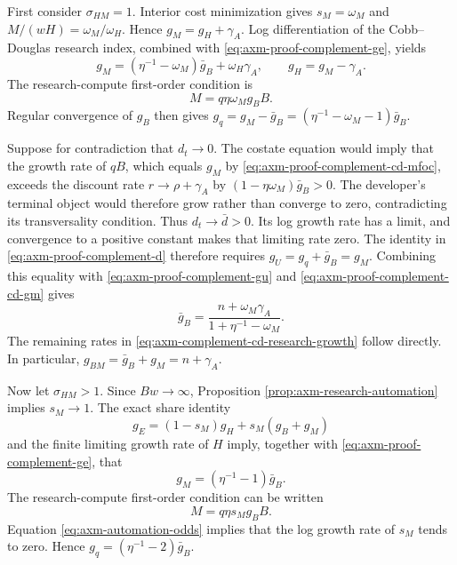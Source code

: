 First consider \(\sigma_{HM}=1\). Interior cost minimization gives
\(s_M=\omega_M\) and \(M/(wH)=\omega_M/\omega_H\). Hence
\(g_M=g_H+\gamma_A\). Log differentiation of the
Cobb--Douglas research index, combined with
\eqref{eq:axm-proof-complement-ge}, yields
\begin{equation}
 g_M=(\eta^{-1}-\omega_M)\bar g_B+\omega_H\gamma_A,
 \qquad g_H=g_M-\gamma_A.
 \label{eq:axm-proof-complement-cd-gm}
\end{equation}
The research-compute first-order condition is
\begin{equation}
 M=q\eta\omega_M g_B B.
 \label{eq:axm-proof-complement-cd-mfoc}
\end{equation}
Regular convergence of \(g_B\) then gives
\(g_q=g_M-\bar g_B=(\eta^{-1}-\omega_M-1)\bar g_B\).

Suppose for contradiction that \(d_t\to0\). The costate equation would imply
that the growth rate of \(qB\), which equals \(g_M\) by
\eqref{eq:axm-proof-complement-cd-mfoc}, exceeds the discount rate
\(r\to\rho+\gamma_A\) by \((1-\eta\omega_M)\bar g_B>0\).
The developer's terminal object would therefore grow rather than
converge to zero, contradicting its transversality condition. Thus
\(d_t\to\bar d>0\). Its log growth rate has a limit, and convergence to a
positive constant makes that limiting rate zero. The identity in
\eqref{eq:axm-proof-complement-d} therefore requires
\(g_U=g_q+\bar g_B=g_M\). Combining this equality with
\eqref{eq:axm-proof-complement-gu} and
\eqref{eq:axm-proof-complement-cd-gm} gives
\[
 \bar g_B=\frac{n+\omega_M\gamma_A}
 {1+\eta^{-1}-\omega_M}.
\]
The remaining rates in \eqref{eq:axm-complement-cd-research-growth} follow
directly. In particular, \(g_{BM}=\bar g_B+g_M=n+\gamma_A\).

Now let \(\sigma_{HM}>1\). Since \(Bw\to\infty\), Proposition
\ref{prop:axm-research-automation} implies \(s_M\to1\). The exact share identity
\[
 g_E=(1-s_M)g_H+s_M(g_B+g_M)
\]
and the finite limiting growth rate of \(H\) imply, together with
\eqref{eq:axm-proof-complement-ge}, that
\begin{equation}
 g_M=(\eta^{-1}-1)\bar g_B.
 \label{eq:axm-proof-complement-ces-gm}
\end{equation}
The research-compute first-order condition can be written
\begin{equation}
 M=q\eta s_M g_B B.
 \label{eq:axm-proof-complement-ces-mfoc}
\end{equation}
Equation \eqref{eq:axm-automation-odds} implies that the log growth rate of
\(s_M\) tends to zero. Hence
\(g_q=(\eta^{-1}-2)\bar g_B\).

